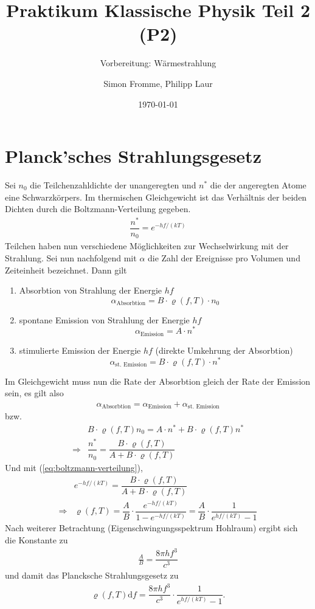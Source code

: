 \documentclass[ngerman, parskip*]{scrartcl}
\title{Praktikum Klassische Physik Teil 2 (P2)}
\subtitle{Vorbereitung: Wärmestrahlung}
\author{Simon Fromme, Philipp Laur}
\date{\today}
\begin{document}
\maketitle
\tableofcontents
\newpage


\section{Planck'sches Strahlungsgesetz}

Sei $n_0$ die Teilchenzahldichte der unangeregten und $n^{*}$ die der angeregten Atome eine Schwarzkörpers. Im thermischen Gleichgewicht ist das Verhältnis der beiden Dichten durch die Boltzmann-Verteilung gegeben.
\begin{align}\label{eq:boltzmann-verteilung}
  \dfrac{n^{*}}{n_0} = e^{-hf/(kT)}
\end{align}
Teilchen haben nun verschiedene Möglichkeiten zur Wechselwirkung mit der Strahlung. Sei nun nachfolgend mit $\alpha$ die Zahl der Ereignisse pro Volumen und Zeiteinheit bezeichnet. Dann gilt
\begin{enumerate}
\item Absorbtion von Strahlung der Energie $hf$ 
  \[ \alpha_{\textrm{Absorbtion}} = B \cdot \varrho(f,T) \cdot n_0 \]
\item spontane Emission von Strahlung der Energie $hf$ 
  \[ \alpha_{\textrm{Emission}} = A \cdot n^{*} \]
\item stimulierte Emission der Energie $hf$ (direkte Umkehrung der Absorbtion)
  \[ \alpha_{\textrm{st. Emission}} = B \cdot \varrho(f,T) \cdot n^{*}\]
\end{enumerate}

Im Gleichgewicht muss nun die Rate der Absorbtion gleich der Rate der Emission sein, es gilt also 
\begin{align*}
  \alpha_{\textrm{Absorbtion}} = \alpha_{\textrm{Emission}} + \alpha_{\textrm{st. Emission}}
\end{align*}
bzw.
\begin{align*}
  & B \cdot \varrho(f,T) n_0 = A \cdot n^{*} + B \cdot \varrho(f,T) n^{*} \\
  \Rightarrow & \dfrac{n^{*}}{n_0} = \dfrac{B \cdot \varrho(f,T)}{A + B \cdot \varrho(f,T)}
\end{align*}
Und mit (\ref{eq:boltzmann-verteilung}),
\begin{align*}
  & e^{-hf/(kT)} = \dfrac{B \cdot \varrho(f,T)}{A + B \cdot \varrho(f,T)} \\
  \Rightarrow & \varrho(f,T) = \dfrac{A}{B} \cdot \dfrac{e^{-hf/(kT)}}{1- e^{-hf/(kT)}} = \dfrac{A}{B} \cdot \dfrac{1}{e^{hf/(kT)}- 1}
\end{align*}
Nach weiterer Betrachtung (Eigenschwingungsspektrum Hohlraum) ergibt sich die Konstante zu
\begin{align*}
  \frac{A}{B} = \dfrac{8\pi h f^3}{c^3}
\end{align*}
und damit das Plancksche Strahlungsgesetz zu 
\begin{align*}
   \varrho(f,T) \textrm{d}f = \dfrac{8\pi h f^3}{c^3}  \cdot \dfrac{1}{e^{hf/(kT)}- 1}.
\end{align*}
\end{document}
